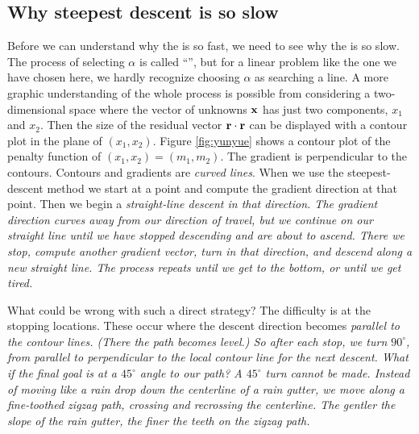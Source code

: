\subsection{Why steepest descent is so slow}
Before we can understand why the  is so fast,
we need to see why the
is so slow.
The process of selecting $\alpha$ is called ``'',
but for a linear problem like the one we have chosen here,
we hardly recognize choosing $\alpha$ as searching a line.
A more graphic understanding of the whole process is possible
from considering a two-dimensional space
where the vector of unknowns $\bold x$
has just two components, $x_1$ and $x_2$.
Then the size of the residual vector $\bold r \cdot \bold r$ can be
displayed with a contour plot in the plane of $(x_1,x_2)$.
Figure \ref{fig:yunyue}
shows a contour plot of the penalty function
of $(x_1,x_2)=(m_1,m_2)$.
The gradient is perpendicular to the contours.
Contours and gradients are {\it curved lines}.
When we use the steepest-descent method we start at a point
and compute the gradient direction at that point.
Then we begin a %
\it straight-line %
\rm descent in that direction.
The gradient direction curves away from our direction of travel,
but we continue on our straight line
until we have stopped descending and are about to ascend.
There we stop, compute another gradient vector,
turn in that direction, and descend along a new straight line.
The process repeats until we get to the bottom,
or until we get tired.


What could be wrong with such a direct strategy?
The difficulty is at the stopping locations.
These occur where the descent direction
becomes %
\it parallel %
\rm to the contour lines.
(There the path becomes level.)
So after each stop, we turn $90^\circ$,
from parallel to perpendicular to the local contour line
for the next descent.
What if the final goal is at a $45^\circ$ angle to our path?
A $45^\circ$ turn cannot be made.
Instead of moving like a rain drop down the centerline of a rain gutter,
we move along a fine-toothed zigzag path,
crossing and recrossing the centerline.
The gentler the slope of the rain gutter,
the finer the teeth on the zigzag path.

\par

